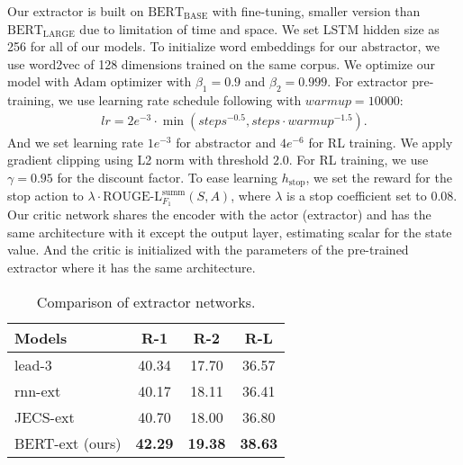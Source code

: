 \documentclass[11pt,a4paper]{article}
\begin{document}
Our extractor is built on $\text{BERT}_\text{BASE}$ with fine-tuning, smaller version
than $\text{BERT}_\text{LARGE}$ due to limitation of time and space.
We set LSTM hidden size as 256 for all of our models.
To initialize word embeddings for our abstractor,
we use word2vec \cite{mikolov2013distributed} of 128 dimensions
trained on the same corpus.
We optimize our model with Adam optimizer \cite{DBLP:journals/corr/KingmaB14} with
$\beta_1=0.9$ and $\beta_2=0.999$.
For extractor pre-training, we use learning rate schedule following \cite{vaswani2017attention}
with $warmup=10000$:
\begin{align*}
lr=2e^{-3}\cdot \min({steps^{-0.5}, steps\cdot warmup^{-1.5}}).
\end{align*}
And we set learning rate $1e^{-3}$ for abstractor and $4e^{-6}$ for RL training.
We apply gradient clipping using L2 norm with threshold $2.0$.
For RL training, we use $\gamma=0.95$ for the discount factor.
To ease learning $h_{\text{stop}}$,
we set the reward for the stop action to $\lambda\cdot\text{ROUGE-L}^{\text{summ}}_{F_1}(S, A)$,
where $\lambda$ is a stop coefficient set to $0.08$.
Our critic network shares the encoder with the actor (extractor)
and has the same architecture with it except the output layer,
estimating scalar for the state value. And the critic is initialized with
the parameters of the pre-trained extractor where it has the same architecture. 

\begin{table}
\begin{center}
\begin{adjustbox}{max width=0.95\columnwidth}
\begin{tabular}{l|ccc}
    \hline 
    \bf Models & \bf R-1 & \bf R-2 & \bf R-L \\ 
    \hline
    lead-3 \cite{see-etal-2017-get} & 40.34 & 17.70 & 36.57 \\
    rnn-ext \cite{chen-bansal-2018-fast} & 40.17 & 18.11 & 36.41 \\
    JECS-ext \cite{xu2019neural} & 40.70 & 18.00 & 36.80 \\ 
    BERT-ext (ours) & \bf 42.29 & \bf 19.38 & \bf 38.63 \\
    \hline
\end{tabular}
\end{adjustbox}
\end{center}
\caption{\label{table:extractor-baseline} Comparison of extractor networks.}
\end{table}
\end{document}
